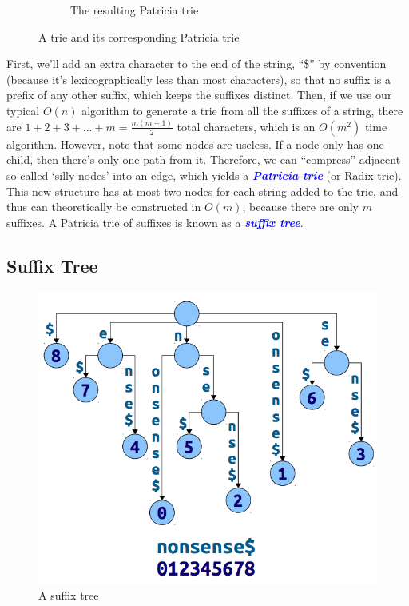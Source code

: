 \documentclass[11pt, oneside]{article}
\newcommand{\emphasis}[1]{\textcolor{blue}{\textbf{\textit{#1}}}}
\begin{document}
\begin{figure}[h!]
\begin{subfigure}[h]{0.4 \textwidth}
      \caption{The resulting Patricia trie}
    \end{subfigure}
    \caption{A trie and its corresponding Patricia trie}
\end{figure}

First, we'll add an extra character to the end of the string,
``\$'' by convention (because it's lexicographically less than most characters),
so that no suffix is a prefix of any other suffix, which keeps the suffixes distinct.
Then, if we use our typical \( O(n) \) algorithm to generate a trie from all the suffixes of a string,
there are \( 1 + 2 + 3 + \dots + m = \frac{m(m + 1)}{2} \) total characters,
which is an \( O(m^2) \) time algorithm. However, note that some nodes are useless.
If a node only has one child, then there's only one path from it.
Therefore, we can ``compress'' adjacent so-called `silly nodes' into an edge,
which yields a \emphasis{Patricia trie} (or Radix trie).
This new structure has at most two nodes for each string added to the trie,
and thus can theoretically be constructed in \( O(m) \), because there are only \( m \) suffixes.
A Patricia trie of suffixes is known as a \emphasis{suffix tree}.

\subsection{Suffix Tree}

\begin{figure}[h!]
\centering
\includegraphics[scale=0.4]{tree}
\caption{A suffix tree}
\end{figure}
\end{document}
